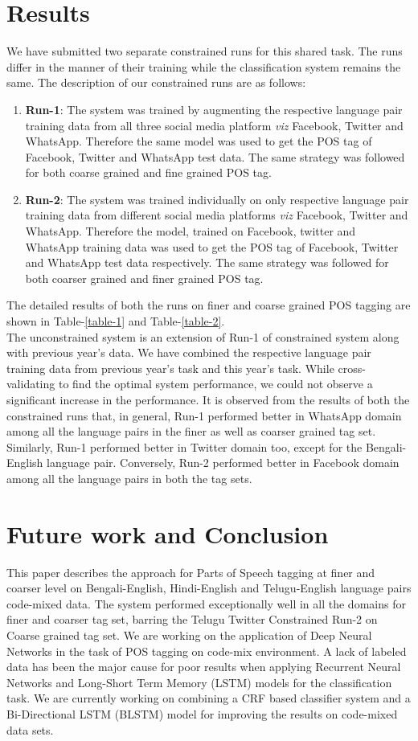 \documentclass[11pt,a4paper]{article}
\begin{document}
\section{Results}
We have submitted two separate constrained runs for this shared task. The runs differ in the manner of their training while the classification system remains the same. The description of  our constrained runs are as follows:
\begin{enumerate}
\item \textbf{Run-1}: The system was trained by augmenting the respective language pair  training data from all three social media platform \textit{viz} Facebook, Twitter and WhatsApp. Therefore the same model was used to get the POS tag of Facebook, Twitter and WhatsApp test data. The same strategy was followed for both coarse grained and fine grained POS tag. 
\item \textbf{Run-2}:  The system was trained individually on only respective language pair training data from different social media platforms \textit{viz} Facebook, Twitter and WhatsApp. Therefore the model, trained on Facebook, twitter and WhatsApp training data was used to get the POS tag of Facebook, Twitter and WhatsApp test data respectively. The same strategy was followed for both coarser grained and finer grained POS tag. 
\end{enumerate}
The detailed results of both the runs on finer and coarse grained POS tagging are shown in Table-\ref{table-1} and Table-\ref{table-2}.\\
The unconstrained system is an extension of Run-1 of constrained system along with previous year's data. We have combined the respective language pair training data from previous year's task and this year's task.  While cross-validating to find the optimal system performance, we could not observe a significant increase in the performance.
It is observed from the results of both the constrained runs that, in general, Run-1 performed better in WhatsApp domain among all the language pairs in the finer as well as coarser grained tag set. Similarly, Run-1 performed better in Twitter domain too, except for the Bengali-English language pair. Conversely, Run-2 performed better in Facebook domain among all the language pairs in both the tag sets.    
\section{Future work and Conclusion}
This paper describes the approach for Parts of Speech tagging at finer and coarser level on Bengali-English, Hindi-English and Telugu-English language pairs code-mixed data. The system performed exceptionally well in all the domains for finer and coarser tag set, barring the Telugu Twitter Constrained Run-2 on Coarse grained tag set. We are working on the application of Deep Neural Networks in the task of POS tagging on code-mix environment. A lack of labeled data has been the major cause for poor results when applying Recurrent Neural Networks and Long-Short Term Memory (LSTM) models for the classification task. We are currently working on combining a CRF based classifier system and a Bi-Directional LSTM (BLSTM) model for improving the results on code-mixed data sets.


\end{document}
